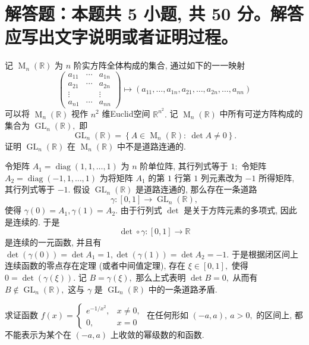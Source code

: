 \section{解答题：本题共 5 小题, 共 50 分。解答应写出文字说明或者证明过程。}


\begin{question}[points = 8]
记 $\operatorname{M}_n(\mathbb{R})$ 为 $n$ 阶实方阵全体构成的集合, 通过如下的一一映射
$$\begin{pmatrix}
a_{11} & \cdots & a_{1n} \\
a_{21} & \cdots & a_{2n} \\
\vdots & & \vdots \\
a_{n1} & \cdots & a_{nn}
\end{pmatrix} \mapsto (a_{11}, \dots, a_{1n}, a_{21}, \dots, a_{2n}, \dots, a_{nn})$$
可以将 $\operatorname{M}_n(\mathbb{R})$ 视作 $n^2$ 维Euclid空间 $\mathbb{R}^{n^2}.$ 记 $\operatorname{M}_n(\mathbb{R})$ 中所有可逆方阵构成的集合为 $\operatorname{GL}_n(\mathbb{R}),$ 即
$$\operatorname{GL}_n(\mathbb{R}) = \left\{ A \in \operatorname{M}_n(\mathbb{R}): ~ \det A \neq 0 \right\}.$$
证明 $\operatorname{GL}_n(\mathbb{R})$ 在 $\operatorname{M}_n(\mathbb{R})$ 中不是道路连通的.

\end{question}

\begin{solution}
令矩阵 $A_1 = \operatorname{diag}(1, 1, \dots, 1)$ 为 $n$ 阶单位阵, 其行列式等于 $1;$ 令矩阵 $A_2 = \operatorname{diag}(-1, 1, \dots, 1)$ 为将矩阵 $A_1$ 的第 $1$ 行第 $1$ 列元素改为 $-1$ 所得矩阵, 其行列式等于 $-1.$ 假设 $\operatorname{GL}_n(\mathbb{R})$ 是道路连通的, 那么存在一条道路
$$\gamma: [0, 1] \longrightarrow \operatorname{GL}_n(\mathbb{R}),$$
使得 $\gamma(0) = A_1, \gamma(1) = A_2.$
由于行列式 $\det$ 是关于方阵元素的多项式, 因此是连续的. 于是
$$\det\circ\gamma: [0, 1] \longrightarrow \mathbb{R}$$
是连续的一元函数, 并且有 $\det(\gamma(0)) = \det A_1 = 1, \det(\gamma(1)) = \det A_2 = -1.$ 于是根据闭区间上连续函数的零点存在定理 (或者中间值定理), 存在 $\xi \in [0, 1],$ 使得 $0 = \det(\gamma(\xi)).$ 记 $B = \gamma(\xi),$ 那么上式表明 $\det B = 0,$ 从而有 $B \not\in \operatorname{GL}_n(\mathbb{R}),$ 这与 $\gamma$ 是 $\operatorname{GL}_n(\mathbb{R})$ 中的一条道路矛盾.
\end{solution}

\begin{question}[points = 10]
求证函数 $f(x) = \begin{cases}
e^{-1/x^2}, & x \neq 0, \\
0, & x = 0
\end{cases}$ 在任何形如 $(-a, a), ~ a > 0,$ 的区间上, 都不能表示为某个在 $(-a, a)$ 上收敛的幂级数的和函数.

\end{question}

